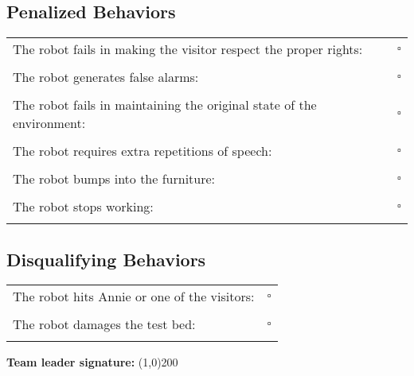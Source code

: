 \subsection*{Penalized Behaviors}
\begin{tabular}{ l c}
The robot fails in making the visitor respect the proper rights: & $\square$ \\ \\
The robot generates false alarms: & $\square$ \\ \\
The robot fails in maintaining the original state of the environment: & $\square$ \\ \\
The robot requires extra repetitions of speech: & $\square$ \\ \\
The robot bumps into the furniture: & $\square$ \\ \\
The robot stops working: & $\square$ \\ \\
\end{tabular}

\subsection*{Disqualifying Behaviors}
\begin{tabular}{ l c}
The robot hits Annie or one of the visitors: & $\square$ \\ \\
The robot damages the test bed: & $\square$ \\ \\
\end{tabular}

\vspace{0.6cm}
\begin{large}
\textbf{Team leader signature:}
\line(1,0){200}
\end{large}